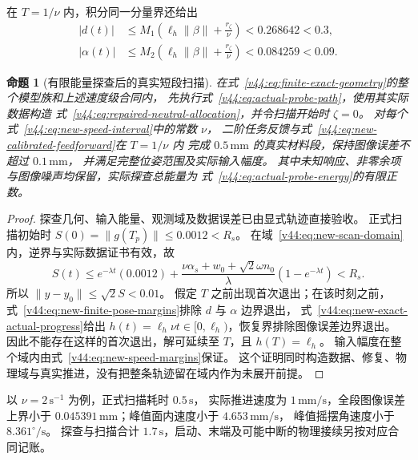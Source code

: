 \documentclass[11pt,a4paper]{article}
\numberwithin{equation}{section}
\newtheorem{proposition}[theorem]{命题}
\theoremstyle{definition}
\begin{document}
在 $T=1/\nu$ 内，积分同一分量界还给出
\begin{align}
 |d(t)|&\le M_1\left(\ell_h\|\beta\|+\frac{r_\zeta}{\nu}\right)
                       <0.268642<0.3,\\
 |\alpha(t)|&\le M_2\left(\ell_h\|\beta\|+\frac{r_\zeta}{\nu}\right)
                       <0.084259<0.09.
 \label{v44:eq:new-finite-pose-margins}
\end{align}

\begin{proposition}[有限能量探查后的真实短段扫描]
\label{v44:prop:nonzero-calibration-scan}
在式~\eqref{v44:eq:finite-exact-geometry}的整个模型族和上述速度级合同内，
先执行式~\eqref{v44:eq:actual-probe-path}，使用其实际数据构造
式~\eqref{v44:eq:repaired-neutral-allocation}，并令扫描开始时 $\zeta=0$。
对每个式~\eqref{v44:eq:new-speed-interval}中的常数 $\nu$，
二阶任务反馈与式~\eqref{v44:eq:new-calibrated-feedforward}在 $T=1/\nu$ 内
完成 $0.5\,\mathrm{mm}$ 的真实材料段，保持图像误差不超过 $0.1\,\mathrm{mm}$，
并满足完整位姿范围及实际输入幅度。
其中未知响应、非零余项与图像噪声均保留，实际探查总能量为
式~\eqref{v44:eq:actual-probe-energy}的有限正数。
\end{proposition}
\begin{proof}
探查几何、输入能量、观测域及数据误差已由显式轨迹直接验收。
正式扫描初始时 $S(0)=\|g(T_p)\|\le0.0012<R_s$。
在域~\eqref{v44:eq:new-scan-domain}内，逆界与实际数据证书有效，故
\begin{equation}
 S(t)\le e^{-\lambda t}(0.0012)
       +\frac{\nu\alpha_s+w_0+\sqrt2\omega n_0}{\lambda}
            (1-e^{-\lambda t})<R_s.
 \label{v44:eq:new-finite-state-envelope}
\end{equation}
所以 $\|y-y_0\|\le\sqrt2S<0.01$。
假定 $T$ 之前出现首次退出；在该时刻之前，
式~\eqref{v44:eq:new-finite-pose-margins}排除 $d$ 与 $\alpha$ 边界退出，
式~\eqref{v44:eq:new-exact-actual-progress}给出
$h(t)=\ell_h\nu t\in[0,\ell_h)$，恢复界排除图像误差边界退出。
因此不能存在这样的首次退出，解可延续至 $T$，且 $h(T)=\ell_h$。
输入幅度在整个域内由式~\eqref{v44:eq:new-speed-margins}保证。
这个证明同时构造数据、修复、物理域与真实推进，没有把整条轨迹留在域内作为未展开前提。
\end{proof}

以 $\nu=2\,\mathrm{s}^{-1}$ 为例，正式扫描耗时 $0.5\,\mathrm{s}$，
实际推进速度为 $1\,\mathrm{mm/s}$，全段图像误差上界小于
$0.045391\,\mathrm{mm}$；峰值面内速度小于 $4.653\,\mathrm{mm/s}$，
峰值摇摆角速度小于 $8.361^\circ/\mathrm{s}$。
探查与扫描合计 $1.7\,\mathrm{s}$，启动、末端及可能中断的物理接续另按对应合同记账。
\end{document}
